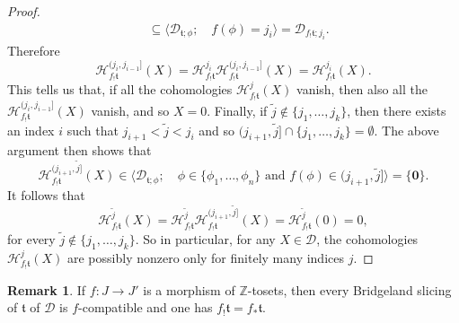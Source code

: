 \documentclass{article}
\theoremstyle{definition}
\newtheorem{rem}[thm]{Remark}
\newcommand{\Z}{\mathbb{Z}}
\newcommand{\tee}{\mathfrak{t}}
\begin{document}
\begin{proof}
\begin{align*}
&\subseteq \langle \mathscr{D}_{\tee;\phi};\quad  f(\phi)=j_{i}\rangle=\mathscr{D}_{f_!\tee;j_{i}}.
\end{align*}
Therefore
\[
\mathcal{H}^{(j_i,j_{i-1}]}_{f_!\tee}(X)=\mathcal{H}^{j_i}_{f_!\tee}\mathcal{H}^{(j_i,j_{i-1}]}_{f_!\tee}(X)=\mathcal{H}^{j_i}_{f_!\tee}(X).
\]
This tells us that, if all the cohomologies $\mathcal{H}^{j}_{f_!\tee}(X)$ vanish, then also all the $\mathcal{H}^{(j_i,j_{i-1}]}_{f_!\tee}(X)$ vanish, and so $X=0$. Finally, if $\tilde{j}\notin\{j_1,\dots,j_k\}$, then there exists an index $i$ such that $j_{i+1}<\tilde{j}<j_{i}$ and so $(j_{i+1},\tilde{j}]\cap \{j_1,\dots,j_k\}=\emptyset$. The above argument then shows that
\[
\mathcal{H}^{(j_{i+1},\tilde{j}]}_{f_!\tee}(X)\in\langle \mathscr{D}_{\tee;\phi};\quad \phi\in\{\phi_1,\dots,\phi_n\}\text{ and } f(\phi)\in(j_{i+1},\tilde{j}]\rangle=\{\mathbf{0}\}.
\]
It follows that 
\[
\mathcal{H}^{\tilde{j}}_{f_!\tee}(X)=\mathcal{H}^{\tilde{j}}_{f_!\tee}\mathcal{H}^{(j_{i+1},\tilde{j}]}_{f_!\tee}(X)=\mathcal{H}^{\tilde{j}}_{f_!\tee}(0)=0,
\]
for every $\tilde{j}\notin \{j_1,\dots,j_k\}$. So in particular, for any $X\in \mathscr{D}$, the cohomologies $\mathcal{H}^{j}_{f_!\tee}(X)$ are possibly nonzero only for finitely many indices $j$. 
\end{proof}

\begin{rem}
If $f\colon J\to J'$  is a morphism of $\Z$-tosets, then every Bridgeland slicing of $\tee$ of $\mathscr{D}$ is $f$-compatible and one has $f_!\tee=f_*\tee$.
\end{rem}
\end{document}
